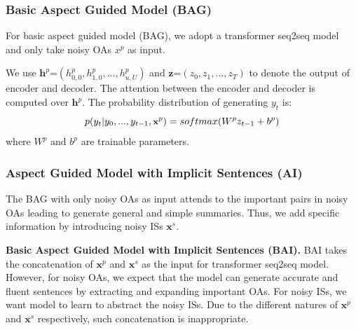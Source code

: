 {{\subsubsection{Basic Aspect Guided Model (BAG)}
For basic aspect guided model (BAG), 
we adopt a transformer seq2seq model~\cite{Transformer17}
and only take noisy OAs $x^p$ as input.

We use $\textbf{h}^p$=$(h^p_{0,0}, h^p_{1,0},...,h^p_{u,U})$ and 
$\textbf{z}$=$(z_0, z_1,...,z_T)$ to denote the output of encoder and decoder.
The attention between the encoder and decoder is computed over $\textbf{h}^p$.
The probability distribution of 
generating $y_t$ is:
\begin{equation}
\small
p(y_t|y_0,...,y_{t-1}, \textbf{x}^p)=softmax(W^pz_{t-1}+b^p)
\label{eq:decode}
\end{equation}
where $W^p$ and $b^p$ are trainable parameters.

\subsubsection{Aspect Guided Model with Implicit Sentences (AI)}
The BAG with only noisy OAs as input attends to the important pairs in noisy OAs leading to generate general and simple summaries.
Thus, we add specific information by introducing noisy ISs $\textbf{x}^s$.

\textbf{Basic Aspect Guided Model with Implicit Sentences (BAI).} 
BAI takes the concatenation of $\textbf{x}^p$ and $\textbf{x}^s$
as the input for transformer seq2seq model. 
However, for noisy OAs, we expect that the model can generate accurate and fluent
sentences by extracting and expanding important OAs.
For noisy ISs, we want model to learn to abstract the noisy ISs.
Due to the different natures of $\textbf{x}^p$ and $\textbf{x}^s$ respectively, 
such concatenation is inappropriate.


}}
